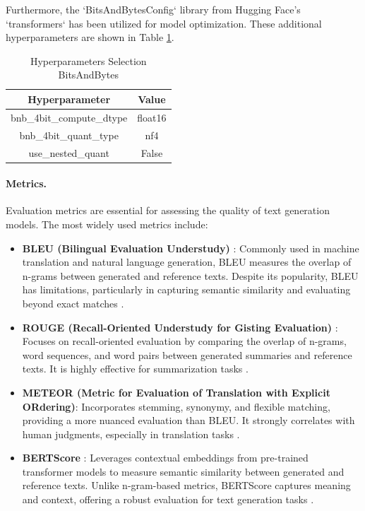 Furthermore, the `BitsAndBytesConfig` library from Hugging Face's `transformers` has been utilized for model optimization. These additional hyperparameters are shown in Table \ref{table:hyperparameters-bitsandbytes}.
\begin{table}[H]
    \centering
    \begin{tabular}{|c|c|}
        \hline
        \textbf{Hyperparameter} & \textbf{Value} \\
        \hline
        bnb\_4bit\_compute\_dtype & float16 \\
        bnb\_4bit\_quant\_type & nf4 \\
        use\_nested\_quant & False \\
        \hline
    \end{tabular}
    \caption{Hyperparameters Selection BitsAndBytes}
    \label{table:hyperparameters-bitsandbytes}
\end{table}

\paragraph{Metrics.} Evaluation metrics are essential for assessing the quality of text generation models. The most widely used metrics include: 

\begin{itemize} 
    \item \textbf{BLEU (Bilingual Evaluation Understudy)} \citep{Papineni02bleu:a}: Commonly used in machine translation and natural language generation, BLEU measures the overlap of n-grams between generated and reference texts. Despite its popularity, BLEU has limitations, particularly in capturing semantic similarity and evaluating beyond exact matches \citep{Reiter2018A}. 
    \item \textbf{ROUGE (Recall-Oriented Understudy for Gisting Evaluation)} \citep{lin-2004-rouge}: Focuses on recall-oriented evaluation by comparing the overlap of n-grams, word sequences, and word pairs between generated summaries and reference texts. It is highly effective for summarization tasks \citep{Ganesan2015ROUGE}.
    \item \textbf{METEOR (Metric for Evaluation of Translation with Explicit ORdering)}\citep{10.5555/1626355.1626389}: Incorporates stemming, synonymy, and flexible matching, providing a more nuanced evaluation than BLEU. It strongly correlates with human judgments, especially in translation tasks \citep{Dobre2015ACB}. 
    \item \textbf{BERTScore} \citep{zhang2020bertscoreevaluatingtextgeneration}: Leverages contextual embeddings from pre-trained transformer models to measure semantic similarity between generated and reference texts. Unlike n-gram-based metrics, BERTScore captures meaning and context, offering a robust evaluation for text generation tasks \citep{zhang2020bertscoreevaluatingtextgeneration}.
\end{itemize}

